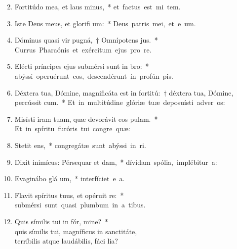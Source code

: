 \begin{flushleft}
\begin{enumerate}[leftmargin=*]
\setcounter{enumi}{1}


\item Fortitúdo mea, et laus  minus,~* \mbox{et factus est mi  tem.}
\item Iste Deus meus, et glorifi um:~* \mbox{Deus patris mei, et e um.}
\item Dóminus quasi vir pugná,~† Omnípotens  jus.~* \mbox{Currus Pharaónis et exércitum ejus pro  re.}
\item Elécti príncipes ejus submérsi sunt in  bro:~* \mbox{abýssi operuérunt eos, descendérunt in profún  pis.}
\item Déxtera tua, Dómine, magnificáta est in fortitú:~† déxtera tua, Dómine, percússit cum.~* \mbox{Et in multitúdine glóriæ tuæ deposuísti adver os:}
\item Misísti iram tuam, quæ devorávit eos  pulam.~* \mbox{Et in spíritu furóris tui congre  quæ:}
\item Stetit  ens,~* \mbox{congregátæ sunt abýssi in  ri.}
\item Dixit inimícus: Pérsequar et dam,~* \mbox{dívidam spólia, implébitur  a:}
\item Evaginábo glá um,~* \mbox{interfíciet e  a.}
\item Flavit spíritus tuus, et opéruit  re:~* \mbox{submérsi sunt quasi plumbum in a tibus.}
\item Quis símilis tui in fór, mine?~* \\quis símilis tui, magníficus in sanctitáte, \\terríbilis atque laudábilis, fáci lia?

\end{enumerate}
\end{flushleft}
